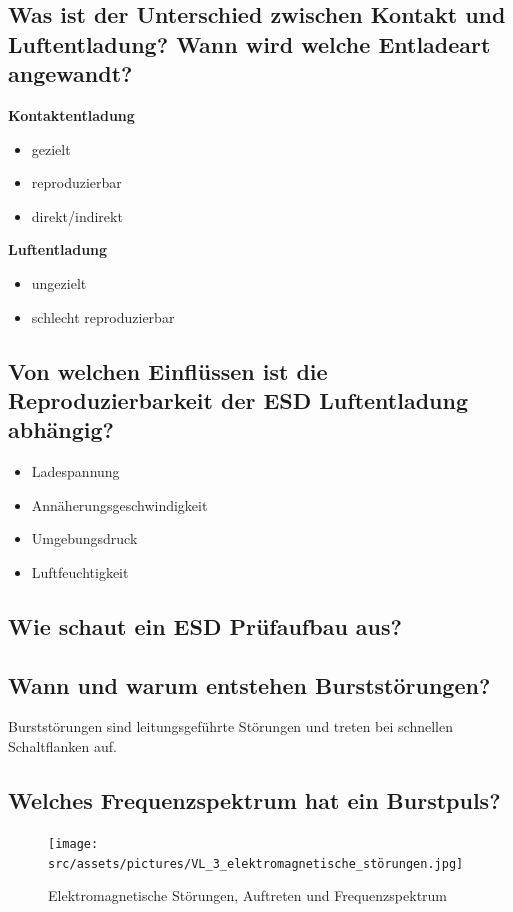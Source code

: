 \subsection{Was ist der Unterschied zwischen Kontakt und Luftentladung? Wann wird welche Entladeart angewandt?}
\textbf{Kontaktentladung}
%
\begin{itemize}
  \item gezielt
  \item reproduzierbar
  \item direkt/indirekt
\end{itemize}
%
\textbf{Luftentladung}
%
\begin{itemize}
  \item ungezielt
  \item schlecht reproduzierbar
\end{itemize}

\subsection{Von welchen Einflüssen ist die Reproduzierbarkeit der ESD Luftentladung abhängig?}
\begin{itemize}
  \item Ladespannung
  \item Annäherungsgeschwindigkeit
  \item Umgebungsdruck
  \item Luftfeuchtigkeit
\end{itemize}

\subsection{Wie schaut ein ESD Prüfaufbau aus?}

\subsection{Wann und warum entstehen Burststörungen?}
Burststörungen sind leitungsgeführte Störungen und treten bei schnellen Schaltflanken auf. 

\subsection{Welches Frequenzspektrum hat ein Burstpuls?}

\begin{figure}[ht]
  \centering
  \texttt{[image: src/assets/pictures/VL\_3\_elektromagnetische\_störungen.jpg]}
  \caption{Elektromagnetische Störungen, Auftreten und Frequenzspektrum}
\end{figure}

